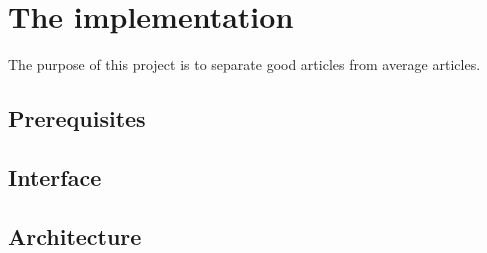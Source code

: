 \section{The implementation}
The purpose of this project is to separate good articles from average articles.

\subsection{Prerequisites}


\subsection{Interface}


\subsection{Architecture}

